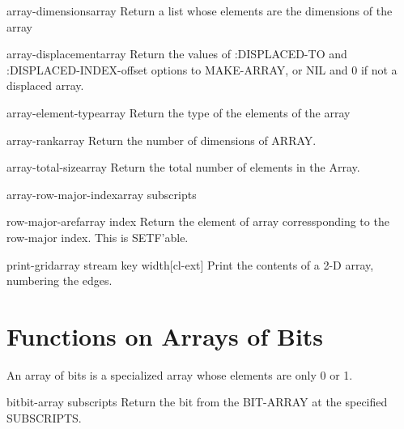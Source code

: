 \documentclass[10pt,english]{book}
\begin{document}
\begin{function}{array-dimensions}{array}
  Return a list whose elements are the dimensions of the array
\end{function}

\begin{function}{array-displacement}{array}
  Return the values of :DISPLACED-TO and :DISPLACED-INDEX-offset
   options to MAKE-ARRAY, or NIL and 0 if not a displaced array.
\end{function}

\begin{function}{array-element-type}{array}
  Return the type of the elements of the array
\end{function}

\begin{function}{array-rank}{array}
  Return the number of dimensions of ARRAY.
\end{function}

\begin{function}{array-total-size}{array}
  Return the total number of elements in the Array.
\end{function}

\begin{function}{array-row-major-index}{array \rest subscripts}
  
\end{function}

\begin{accessor}{row-major-aref}{array index}
  Return the element of array corressponding to the row-major index. This is
   SETF'able.
\end{accessor}

\begin{function}{print-grid}{array \key stream key width}[cl-ext]
  Print the contents of a 2-D array, numbering the edges.
\end{function}

\section{Functions on Arrays of Bits}
\label{sec:funct-arrays-bits}

An array of bits is a specialized array whose elements are only 0 or
1.

\begin{accessor}{bit}{bit-array \rest subscripts}
  Return the bit from the BIT-ARRAY at the specified SUBSCRIPTS.
\end{accessor}
\end{document}
